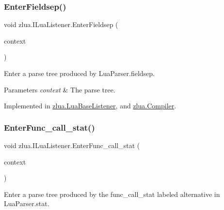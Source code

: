 \subsubsection{\texorpdfstring{Enter\+Fieldsep()}{EnterFieldsep()}}
{\footnotesize\ttfamily void zlua.\+I\+Lua\+Listener.\+Enter\+Fieldsep (\begin{DoxyParamCaption}\item[{\mbox{[}\+Not\+Null\mbox{]} \mbox{\hyperlink{classzlua_1_1_lua_parser_1_1_fieldsep_context}{Lua\+Parser.\+Fieldsep\+Context}}}]{context }\end{DoxyParamCaption})}



Enter a parse tree produced by Lua\+Parser.\+fieldsep. 


\begin{DoxyParams}{Parameters}
{\em context} & The parse tree.\\
\hline
\end{DoxyParams}


Implemented in \mbox{\hyperlink{classzlua_1_1_lua_base_listener_a2f94f0a470d5c71b06cb6daa8873e069}{zlua.\+Lua\+Base\+Listener}}, and \mbox{\hyperlink{classzlua_1_1_compiler_a4cd23e46335e41cd5c30ffae494efbec}{zlua.\+Compiler}}.

\mbox{\label{interfacezlua_1_1_i_lua_listener_a082ec71bf7dc3bee6dd365c9a56ee59c}} 
\subsubsection{\texorpdfstring{Enter\+Func\+\_\+call\+\_\+stat()}{EnterFunc\_call\_stat()}}
{\footnotesize\ttfamily void zlua.\+I\+Lua\+Listener.\+Enter\+Func\+\_\+call\+\_\+stat (\begin{DoxyParamCaption}\item[{\mbox{[}\+Not\+Null\mbox{]} \mbox{\hyperlink{classzlua_1_1_lua_parser_1_1_func__call__stat_context}{Lua\+Parser.\+Func\+\_\+call\+\_\+stat\+Context}}}]{context }\end{DoxyParamCaption})}



Enter a parse tree produced by the {\ttfamily func\+\_\+call\+\_\+stat} labeled alternative in Lua\+Parser.\+stat. 


